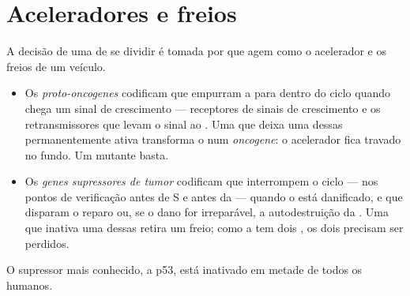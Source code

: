 \section{Aceleradores e freios}

\begin{proposition}\label{prop:g11:cancer:genes}
A decisão de uma  de se dividir é tomada por  que agem
como o acelerador e os freios de um veículo.
\begin{itemize}
  \item Os \emph{proto-oncogenes} codificam
         que empurram a  para dentro do ciclo quando
        chega um sinal de crescimento --- receptores de sinais de
        crescimento e os retransmissores que levam o sinal ao .
        Uma  que deixa uma  dessas permanentemente
        ativa transforma o  num \emph{oncogene}: o acelerador fica
        travado no fundo. Um  mutante basta.
  \item Os \emph{genes supressores de tumor}
        codificam  que interrompem o ciclo --- nos pontos de
        verificação antes de S e antes da  --- quando o  está
        danificado, e que disparam o reparo ou, se o dano for
        irreparável, a autodestruição da . Uma  que
        inativa uma  dessas retira um freio; como a  tem
        dois , os dois precisam ser perdidos.
\end{itemize}
O supressor mais conhecido, a  p53, está inativado em metade de
todos os  humanos.
\end{proposition}
\admitted

